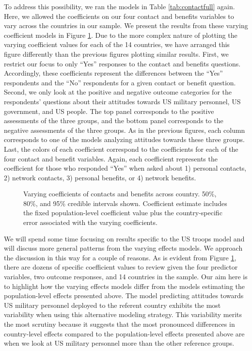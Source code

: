 To address this possibility, we ran the models in Table \ref{tab:contactfull} again. Here, we allowed the coefficients on our four contact and benefits variables to vary across the countries in our sample. We present the results from these varying coefficient models in Figure \ref{fig:contactcoefficientsvarying}. Due to the more complex nature of plotting the varying coefficient values for each of the 14 countries, we have arranged this figure differently than the previous figures plotting similar results. First, we restrict our focus to only ``Yes'' responses to the contact and benefits questions. Accordingly, these coefficients represent the differences between the ``Yes'' respondents and the ``No'' respondents for a given contact or benefit question. Second, we only look at the positive and negative outcome categories for the respondents' questions about their attitudes towards US military personnel, US government, and US people. The top panel corresponds to the positive assessments of the three groups, and the bottom panel corresponds to the negative assessments of the three groups. As in the previous figures, each column corresponds to one of the models analyzing attitudes towards these three groups. Last, the colors of each coefficient correspond to the coefficients for each of the four contact and benefit variables. Again, each coefficient represents the coefficient for those who responded ``Yes'' when asked about 1) personal contacts, 2) network contacts, 3) personal benefits, or 4) network benefits.  


\begin{figure}
	\centering{}
	\caption{Varying coefficients of contacts and benefits across country. 50\%, 80\%, and 95\% credible intervals shown. Coefficient estimate includes the fixed population-level coefficient value plus the country-specific error associated with the varying coefficients.}
	\label{fig:contactcoefficientsvarying}
\end{figure}

We will spend some time focusing on results specific to the US troops model and will discuss more general patterns from the varying effects models. We approach the discussion in this way for a couple of reasons. As is evident from Figure \ref{fig:contactcoefficientsvarying}, there are dozens of specific coefficient values to review given the four predictor variables, two outcome responses, and 14 countries in the sample. Our aim here is to highlight how the varying effects models differ from the models estimating the population-level effects presented above. The model predicting attitudes towards US military personnel deployed to the referent country exhibits the most variability when using this alternative modeling strategy. This variability merits the most scrutiny because it suggests that the most pronounced differences in country-level effects compared to the population-level effects presented above are when we look at US military personnel more than the other reference groups.



